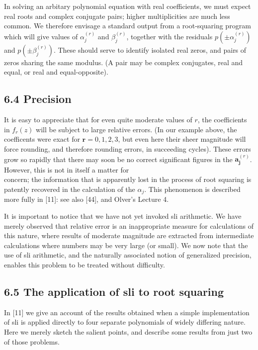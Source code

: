 \documentclass[10pt]{article}
\begin{document}
In solving an arbitary polynomial equation with real coefficients, we must expect real roots and complex conjugate pairs; higher multiplicities are much less common. We therefore envisage a standard output from a root-squaring program which will give values of $\alpha_{j}^{(r)}$ and $\beta_{j}^{(r)}$, together with the residuals $p\left( \pm \alpha_{j}^{(r)}\right)$ and $p\left( \pm \beta_{j}^{(r)}\right)$. These should serve to identify isolated real zeros, and pairs of zeros sharing the same modulus. (A pair may be complex conjugates, real and equal, or real and equal-opposite).

\subsection*{6.4 Precision}
It is easy to appreciate that for even quite moderate values of $r$, the coefficients in $f_{r}(z)$ will be subject to large relative errors. (In our example above, the coefficents were exact for $\mathbf{r}=0,1,2,3$, but even here their sheer magnitude will force rounding, and therefore rounding errors, in succeeding cycles). These errors grow so rapidly that there may soon be no correct significant figures in the $\mathbf{a}_{\mathbf{j}}^{(r)}$. However, this is not in itself a matter for\\
concern; the information that is apparently lost in the process of root squaring is patently recovered in the calculation of the $\alpha_{j}$. This phenomenon is described more fully in [11]: see also [44], and Olver's Lecture 4.

It is important to notice that we have not yet invoked sli arithmetic. We have merely observed that relative error is an inappropriate measure for calculations of this nature, where results of moderate magnitude are extracted from intermediate calculations where numbers may be very large (or small). We now note that the use of sli arithmetic, and the naturally associated notion of generalized precision, enables this problem to be treated without difficulty.

\subsection*{6.5 The application of sli to root squaring}
In [11] we give an account of the results obtained when a simple implementation of sli is applied directly to four separate polynomials of widely differing nature. Here we merely sketch the salient points, and describe some results from just two of those problems.
\end{document}

